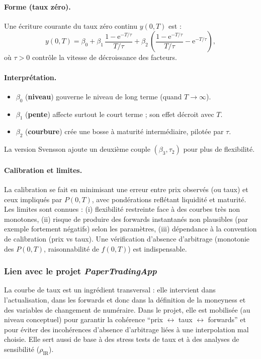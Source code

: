 \documentclass[11pt,a4paper]{article}
\newcommand{\ee}{\mathrm{e}}
\newcommand{\1}{\mathbf{1}}
\begin{document}
\paragraph{Forme (taux z\'ero).}
Une \'ecriture courante du taux z\'ero continu $y(0,T)$ est :
\[
y(0,T)
=
\beta_0
+
\beta_1\,
\frac{1-\ee^{-T/\tau}}{T/\tau}
+
\beta_2\,
\left(
\frac{1-\ee^{-T/\tau}}{T/\tau}
- \ee^{-T/\tau}
\right),
\]
o\`u $\tau>0$ contr\^ole la vitesse de d\'ecroissance des facteurs.

\paragraph{Interpr\'etation.}
\begin{itemize}
  \item $\beta_0$ (\textbf{niveau}) gouverne le niveau de long terme (quand $T\to\infty$).
  \item $\beta_1$ (\textbf{pente}) affecte surtout le court terme ; son effet d\'ecroit avec $T$.
  \item $\beta_2$ (\textbf{courbure}) cr\'ee une bosse \`a maturit\'e interm\'ediaire, pilot\'ee par $\tau$.
\end{itemize}
La version Svensson ajoute un deuxi\`eme couple $(\beta_3,\tau_2)$ pour plus de flexibilit\'e.

\paragraph{Calibration et limites.}
La calibration se fait en minimisant une erreur entre prix observ\'es (ou taux) et ceux impliqu\'es par $P(0,T)$, avec pond\'erations
refl\'etant liquidit\'e et maturit\'e. Les limites sont connues : (i) flexibilit\'e restreinte face \`a des courbes tr\`es non monotones,
(ii) risque de produire des forwards instantan\'es non plausibles (par exemple fortement n\'egatifs) selon les param\`etres,
(iii) d\'ependance \`a la convention de calibration (prix vs taux). Une v\'erification d'absence d'arbitrage (monotonie des $P(0,T)$,
raisonnabilit\'e de $f(0,T)$) est indispensable.


\subsubsection{Lien avec le projet \emph{PaperTradingApp}}

La courbe de taux est un ingr\'edient transversal : elle intervient dans l'actualisation, dans les forwards et donc dans la d\'efinition
de la moneyness et des variables de changement de num\'eraire. Dans le projet, elle est mobilis\'ee (au niveau conceptuel) pour garantir
la coh\'erence ``prix $\leftrightarrow$ taux $\leftrightarrow$ forwards'' et pour \'eviter des incoh\'erences d'absence d'arbitrage li\'ees \`a une interpolation
mal choisie. Elle sert aussi de base \`a des stress tests de taux et \`a des analyses de sensibilit\'e ($\rho_{\mathrm{IR}}$).
\end{document}
